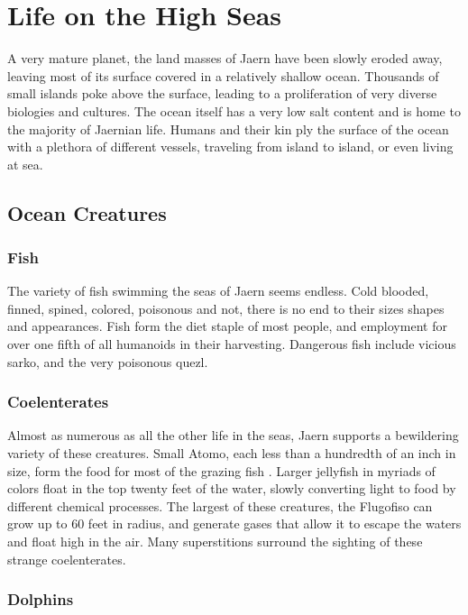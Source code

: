 \chapter{Life on the High Seas}
\label{ch:high-seas}
A very mature planet, the land masses of Jaern have been slowly eroded away, leaving most of its surface covered in a relatively shallow ocean. Thousands of small islands poke above the surface, leading to a proliferation of very diverse biologies and cultures. The ocean itself has a very low salt content and is home to the majority of Jaernian life. Humans and their kin ply the surface of the ocean with a plethora of different vessels, traveling from island to island, or even living at sea.
\section{Ocean Creatures}
\subsection{Fish}

The variety of fish swimming the seas of Jaern seems endless. Cold blooded, finned, spined, colored, poisonous and not, there is no end to their sizes shapes and appearances. Fish form the diet staple of most people, and employment for over one fifth of all humanoids in their harvesting. Dangerous fish include vicious sarko, and the very poisonous quezl.
\subsection{Coelenterates}

Almost as numerous as all the other life in the seas, Jaern supports a bewildering variety of these creatures. Small Atomo, each less than a hundredth of an inch in size, form the food for most of the grazing fish . Larger jellyfish in myriads of colors float in the top twenty feet of the water, slowly converting light to food by different chemical  processes. The largest of these creatures, the Flugofiso can grow up to 60 feet in radius, and generate gases that allow it to escape the waters and float high in the air. Many superstitions surround the sighting of these strange coelenterates. 
\subsection{Dolphins}

